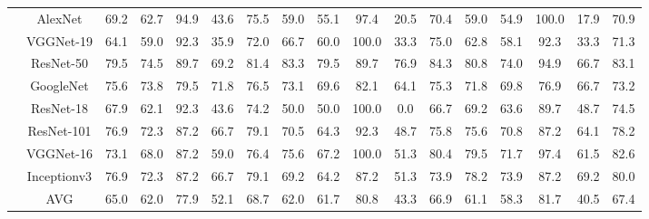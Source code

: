 \documentclass[12pt,italian]{article}
\begin{document}
\begin{tiny}
\begin{longtable}{lcccccccccccccccc}
& AlexNet & 69.2 & 62.7 & 94.9 & 43.6 & 75.5 & 59.0 & 55.1 & 97.4 & 20.5 & 70.4 & 59.0 & 54.9 & 100.0 & 17.9 & 70.9 \\ 
& VGGNet-19 & 64.1 & 59.0 & 92.3 & 35.9 & 72.0 & 66.7 & 60.0 & 100.0 & 33.3 & 75.0 & 62.8 & 58.1 & 92.3 & 33.3 & 71.3 \\ 
& ResNet-50 & 79.5 & 74.5 & 89.7 & 69.2 & 81.4 & 83.3 & 79.5 & 89.7 & 76.9 & 84.3 & 80.8 & 74.0 & 94.9 & 66.7 & 83.1 \\ 
& GoogleNet & 75.6 & 73.8 & 79.5 & 71.8 & 76.5 & 73.1 & 69.6 & 82.1 & 64.1 & 75.3 & 71.8 & 69.8 & 76.9 & 66.7 & 73.2 \\ 
& ResNet-18 & 67.9 & 62.1 & 92.3 & 43.6 & 74.2 & 50.0 & 50.0 & 100.0 &  0.0 & 66.7 & 69.2 & 63.6 & 89.7 & 48.7 & 74.5 \\ 
& ResNet-101 & 76.9 & 72.3 & 87.2 & 66.7 & 79.1 & 70.5 & 64.3 & 92.3 & 48.7 & 75.8 & 75.6 & 70.8 & 87.2 & 64.1 & 78.2 \\ 
& VGGNet-16 & 73.1 & 68.0 & 87.2 & 59.0 & 76.4 & 75.6 & 67.2 & 100.0 & 51.3 & 80.4 & 79.5 & 71.7 & 97.4 & 61.5 & 82.6 \\ 
& Inceptionv3 & 76.9 & 72.3 & 87.2 & 66.7 & 79.1 & 69.2 & 64.2 & 87.2 & 51.3 & 73.9 & 78.2 & 73.9 & 87.2 & 69.2 & 80.0 \\ 
\hline
& AVG & 65.0 & 62.0 & 77.9 & 52.1 & 68.7 & 62.0 & 61.7 & 80.8 & 43.3 & 66.9 & 61.1 & 58.3 & 81.7 & 40.5 & 67.4 \\ 
\hline
\bottomrule
\end{longtable} 

 \pagebreak 
\end{tiny} 
 
\end{document}
